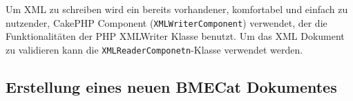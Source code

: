 	Um XML zu schreiben wird ein bereits vorhandener, komfortabel und einfach zu nutzender, CakePHP Component (\texttt{XMLWriterComponent}) verwendet, der die Funktionalitäten der PHP XMLWriter Klasse benutzt. Um das XML Dokument zu validieren kann die \texttt{XMLReaderComponetn}-Klasse verwendet werden.
	
	\subsection{Erstellung eines neuen BMECat Dokumentes}